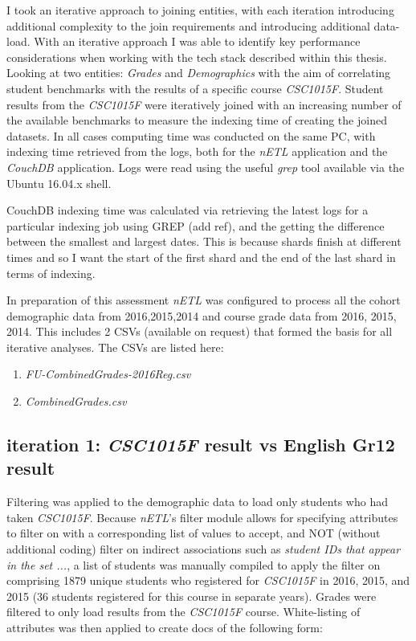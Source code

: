 I took an iterative approach to joining entities, with each iteration introducing additional complexity to the join requirements and introducing additional data-load. With an iterative approach I was able to identify key performance considerations when working with the tech stack described within this thesis. Looking at two entities: \textit{Grades} and \textit{Demographics} with the aim of correlating student benchmarks with the results of a specific course \textit{CSC1015F}. Student results from the \textit{CSC1015F} were iteratively joined with an increasing number of the available benchmarks to measure the indexing time of creating the joined datasets. In all cases computing time was conducted on the same PC, with indexing time retrieved from the logs, both for the \textit{nETL} application and the \textit{CouchDB} application. Logs were read using the useful \textit{grep} tool available via the Ubuntu 16.04.x shell.

CouchDB indexing time was calculated via retrieving the latest logs for a particular indexing job using GREP (add ref), and the getting the difference between the smallest and largest dates. This is because shards finish at different times and so I want the start of the first shard and the end of the last shard in terms of indexing.

In preparation of this assessment \textit{nETL} was configured to process all the cohort demographic data from 2016,2015,2014 and course grade data from 2016, 2015, 2014. This includes 2 CSVs (available on request) that formed the basis for all iterative analyses. The CSVs are listed here:

\begin{enumerate}
    \item \textit{FU-CombinedGrades-2016Reg.csv}
    \item \textit{CombinedGrades.csv}
\end{enumerate}

\subsection{iteration 1: \textit{CSC1015F} result vs English Gr12 result}
Filtering was applied to the demographic data to load only students who had taken \textit{CSC1015F}. Because \textit{nETL}'s filter module allows for specifying attributes to filter on with a corresponding list of values to accept, and NOT (without additional coding) filter on indirect associations such as \textit{student IDs that appear in the set ...}, a list of students was manually compiled to apply the filter on comprising 1879 unique students who registered for \textit{CSC1015F} in 2016, 2015, and 2015 (36 students registered for this course in separate years). Grades were filtered to only load results from the \textit{CSC1015F} course. White-listing of attributes was then applied to create docs of the following form:

